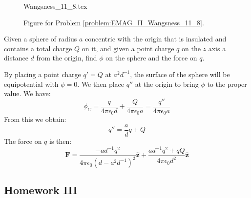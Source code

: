 \documentclass[crop=false,class=book,oneside]{standalone}
\begin{document}
            \begin{figure}[H]
                \centering
                \captionsetup{type=figure}
                {Wangsness_11_8.tex}
                \caption{Figure for Problem
                         \ref{problem:EMAG_II_Wangsness_11_8}.}
                \label{fig:EMAG_II_Wangsness_11_8}
            \end{figure}
            \begin{problem}
                Given a sphere of radius $a$ concentric with the
                origin that is insulated and contains a total charge
                $Q$ on it, and given a point charge $q$ on the
                $z$ axis a distance $d$ from the origin, find
                $\phi$ on the sphere and the force on $q$.
            \end{problem}
            \begin{solution}
                By placing a point charge $q'=Q$ at
                $a^{2}d^{\minus{1}}$, the surface of the sphere
                will be equipotential with $\phi=0$. We then place
                $q''$ at the origin to bring $\phi$ to the proper
                value. We have:
                \begin{equation}
                    \phi_{C}=\frac{q}{4\pi\epsilon_{0}d}+
                        \frac{Q}{4\pi\epsilon_{0}a}
                    =\frac{q''}{4\pi\epsilon_{0}a}
                \end{equation}
                From this we obtain:
                \begin{equation}
                    q''=\frac{a}{d}q+Q
                \end{equation}
                The force on $q$ is then:
                \begin{equation}
                    \mathbf{F}=
                    \frac{\minus{a}d^{\minus{1}}q^{2}}
                        {4\pi\epsilon_{0}(d-a^{2}d^{\minus{1}})^{2}}
                    \hat{\mathbf{z}}+
                    \frac{ad^{\minus{1}}q^{2}+qQ}
                        {4\pi\epsilon_{0}d^{2}}
                    \hat{\mathbf{z}}
                \end{equation}
            \end{solution}
        \subsection{Homework III}
            \begin{problem}
            
            \end{problem}
\end{document}
